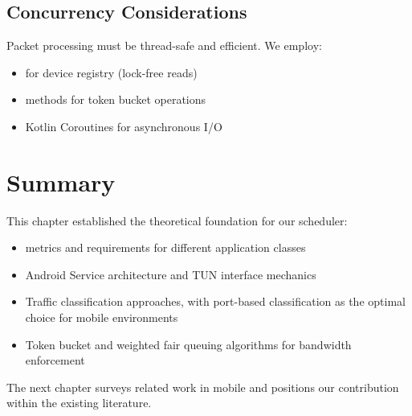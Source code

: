 \subsection{Concurrency Considerations}

Packet processing must be thread-safe and efficient. We employ:
\begin{itemize}
    \item {} for device registry (lock-free reads)
    \item {} methods for token bucket operations
    \item Kotlin Coroutines for asynchronous I/O
\end{itemize}

\section{Summary}

This chapter established the theoretical foundation for our \qos scheduler:
\begin{itemize}
    \item \qos metrics and requirements for different application classes
    \item Android \vpn Service architecture and TUN interface mechanics
    \item Traffic classification approaches, with port-based classification as the optimal choice for mobile environments
    \item Token bucket and weighted fair queuing algorithms for bandwidth enforcement
\end{itemize}

The next chapter surveys related work in mobile \qos and positions our contribution within the existing literature.

